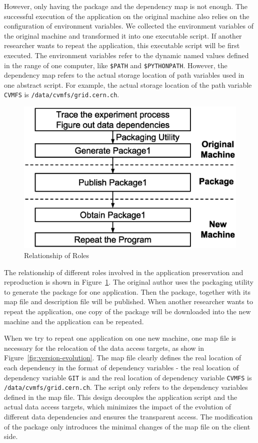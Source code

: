 \documentclass{sig-alternate}
\begin{document}
However, only having the package and the dependency map is not enough. The successful execution of the application on the original machine also relies on the configuration of environment variables.
We collected the environment variables of the original machine and transformed it into one executable script. If another researcher wants to repeat the application, this executable script will be first executed. 
The environment variables refer to the dynamic named values defined in the range of one computer, like \verb!$PATH! and \verb!$PYTHONPATH!.
However, the dependency map refers to the actual storage location of path variables used in one abstract script. For example, the actual storage location of the path variable \verb!CVMFS! 
is {\tt /data/cvmfs/grid.cern.ch}.

\begin{figure}
\centering
\includegraphics[width=.8\columnwidth]{solution3.eps}
\caption{Relationship of Roles}
\label{fig:solution3}
\end{figure}

The relationship of different roles involved in the application preservation and
reproduction is shown in Figure~\ref{fig:solution3}.  The original author uses the packaging utility to generate the package for one application.
Then the package, together with
its map file and description file will be published. When
another researcher wants to repeat the application, one copy of the package will be downloaded into the new machine and the application can be repeated.

When we try to repeat one application on one new machine, one map file is necessary for the relocation of the data access targets, as
show in Figure~\ref{fig:version-evolution}. 
The map file clearly defines the real location of each dependency in the format of dependency variables - the real location of dependency variable {\tt GIT} is  and the real location of dependency variable {\tt CVMFS}
is {\tt /data/cvmfs/grid.cern.ch}.
The script only refers to the dependency variables defined in the map file.
This design decouples the application script and the actual data access targets, which minimizes the impact of the evolution of different data dependencies
and ensures the transparent access.
The modification of the package only introduces the minimal changes of the map file on the client side.
\end{document}
